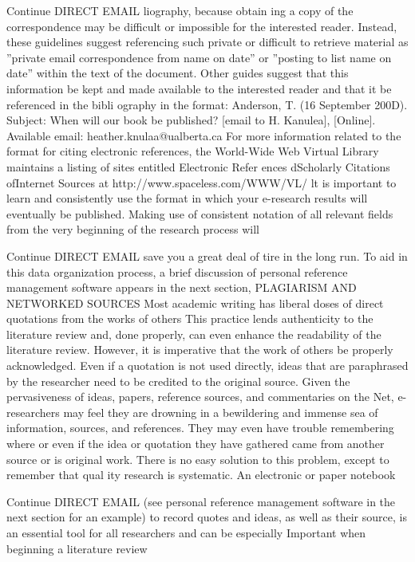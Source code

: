 \documentclass{beamer}
\begin{document}
\begin{frame}{Continue DIRECT EMAIL}
liography, because obtain ing a copy of the correspondence may be difficult
or impossible for the interested reader. Instead, these guidelines suggest
referencing such private or difficult to retrieve material as ”private email
correspondence from name on date” or ”posting to list name on date” within
the text of the document. Other guides suggest that this information be
kept and made available to the interested reader and that it be referenced
in the bibli ography in the format:
Anderson, T. (16 September 200D). Subject: When will our book be
published? [email to H. Kanulea], [Online]. Available email:
heather.knulaa@ualberta.ca
For more information related to the format for citing electronic references,
the World-Wide Web Virtual Library maintains a listing of sites
entitled Electronic Refer ences dScholarly Citations ofInternet Sources at
http://www.spaceless.com/WWW/VL/ lt is important to learn and consistently
use the format in which your e-research results will eventually be
published. Making use of consistent notation of all relevant fields from the
very beginning of the research process will
\end{frame}	
\begin{frame}{Continue DIRECT EMAIL}
save you a great deal of tire in
the long run. To aid in this data organization process, a brief discussion of
personal reference management software appears in the next section,
PLAGIARISM AND NETWORKED SOURCES Most academic writing
has liberal doses of direct quotations from the works of others This
practice lends authenticity to the literature review and, done properly, can
even enhance the readability of the literature review. However, it is imperative
that the work of others be properly acknowledged. Even if a quotation
is not used directly, ideas that are paraphrased by the researcher need to
be credited to the original source. Given the pervasiveness of ideas, papers,
reference sources, and commentaries on the Net, e-researchers may feel they
are drowning in a bewildering and immense sea of information, sources, and
references. They may even have trouble remembering where or even if the
idea or quotation they have gathered came from another source or is original
work. There is no easy solution to this problem, except to remember
that qual ity research is systematic. An electronic or paper notebook
\end{frame}	
\begin{frame}{Continue DIRECT EMAIL}
(see personal reference management software in the next section for an example)
to record quotes and ideas, as well as their source, is an essential tool for
all researchers and can be especially Important when beginning a literature
review
\end{frame}


\end{document}
